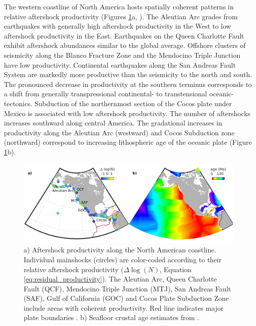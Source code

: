 \documentclass[draft, jgrga]{agujournal2018}
\begin{document}
    The western coastline of North America hosts spatially coherent patterns in relative aftershock productivity (Figures \ref{fig:region}a, ). The Aleutian Arc grades from earthquakes with generally high aftershock productivity in the West to low aftershock productivity in the East. Earthquakes on the Queen Charlotte Fault exhibit aftershock abundances similar to the global average. Offshore clusters of seismicity along the Blanco Fracture Zone and the Mendocino Triple Junction have low productivity. Continental earthquakes along the San Andreas Fault System are markedly more productive than the seismicity to the north and south. The pronounced decrease in productivity at the southern terminus corresponds to a shift from generally transpressional continental- to transtensional oceanic-tectonics. Subduction of the northernmost section of the Cocos plate under Mexico is associated with low aftershock productivity. The number of aftershocks increases southward along central America. The gradational increases in productivity along the Aleutian Arc (westward) and Cocos Subduction zone (northward) correspond to increasing lithospheric age of the oceanic plate (Figure \ref{fig:region}b).

    \begin{figure}
        \centering
        \includegraphics[width = \linewidth]{figures/regions.png}
        \caption{a) Aftershock productivity along the North American coastline.  Individual mainshocks (circles) are color-coded according to their relative aftershock productivity ($\Delta \log(N)$, Equation \ref{eq:residual_productivity}). The Aleutian Arc, Queen Charlotte Fault (QCF), Mendocino Triple Junction (MTJ), San Andreas Fault (SAF), Gulf of California (GOC) and Cocos Plate Subduction Zone include areas with coherent productivity. Red line indicates major plate boundaries \citep{Bird2003AnBoundaries}. b) Seafloor crustal age estimates from \citet{Muller2008}.}
        \label{fig:region}
    \end{figure}
    
\end{document}
